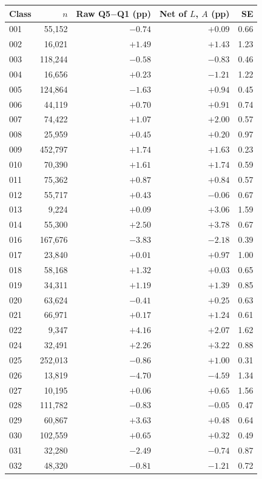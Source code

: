\begin{tabular}{lrrrr}
\toprule
Class & $n$ & Raw Q5$-$Q1 (pp) & Net of $L$, $A$ (pp) & SE \\
\midrule
001 & 55,152 & $-0.74$ & $+0.09$ & 0.66 \\
002 & 16,021 & $+1.49$ & $+1.43$ & 1.23 \\
003 & 118,244 & $-0.58$ & $-0.83$ & 0.46 \\
004 & 16,656 & $+0.23$ & $-1.21$ & 1.22 \\
005 & 124,864 & $-1.63$ & $+0.94$ & 0.45 \\
006 & 44,119 & $+0.70$ & $+0.91$ & 0.74 \\
007 & 74,422 & $+1.07$ & $+2.00$ & 0.57 \\
008 & 25,959 & $+0.45$ & $+0.20$ & 0.97 \\
009 & 452,797 & $+1.74$ & $+1.63$ & 0.23 \\
010 & 70,390 & $+1.61$ & $+1.74$ & 0.59 \\
011 & 75,362 & $+0.87$ & $+0.84$ & 0.57 \\
012 & 55,717 & $+0.43$ & $-0.06$ & 0.67 \\
013 & 9,224 & $+0.09$ & $+3.06$ & 1.59 \\
014 & 55,300 & $+2.50$ & $+3.78$ & 0.67 \\
016 & 167,676 & $-3.83$ & $-2.18$ & 0.39 \\
017 & 23,840 & $+0.01$ & $+0.97$ & 1.00 \\
018 & 58,168 & $+1.32$ & $+0.03$ & 0.65 \\
019 & 34,311 & $+1.19$ & $+1.39$ & 0.85 \\
020 & 63,624 & $-0.41$ & $+0.25$ & 0.63 \\
021 & 66,971 & $+0.17$ & $+1.24$ & 0.61 \\
022 & 9,347 & $+4.16$ & $+2.07$ & 1.62 \\
024 & 32,491 & $+2.26$ & $+3.22$ & 0.88 \\
025 & 252,013 & $-0.86$ & $+1.00$ & 0.31 \\
026 & 13,819 & $-4.70$ & $-4.59$ & 1.34 \\
027 & 10,195 & $+0.06$ & $+0.65$ & 1.56 \\
028 & 111,782 & $-0.83$ & $-0.05$ & 0.47 \\
029 & 60,867 & $+3.63$ & $+0.48$ & 0.64 \\
030 & 102,559 & $+0.65$ & $+0.32$ & 0.49 \\
031 & 32,280 & $-2.49$ & $-0.74$ & 0.87 \\
032 & 48,320 & $-0.81$ & $-1.21$ & 0.72 \\

\end{tabular}
